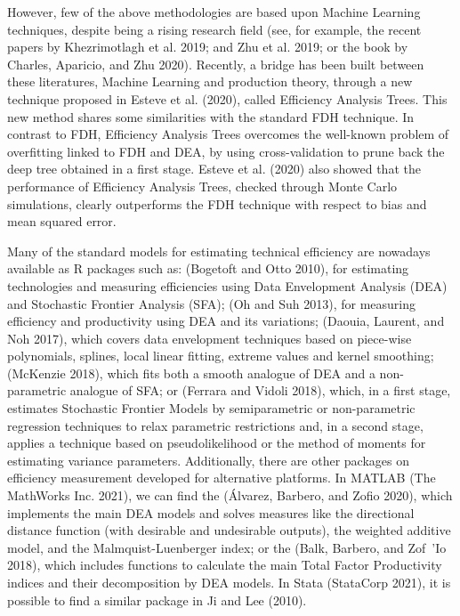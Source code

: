 However, few of the above methodologies are based upon Machine Learning techniques, despite being a rising research field (see, for example, the recent papers by Khezrimotlagh et al. 2019; and Zhu et al. 2019; or the book by Charles, Aparicio, and Zhu 2020). Recently, a bridge has been built between these literatures, Machine Learning and production theory, through a new technique proposed in Esteve et al. (2020), called Efficiency Analysis Trees. This new method shares some similarities with the standard FDH technique. In contrast to FDH, Efficiency Analysis Trees overcomes the well-known problem of overfitting linked to FDH and DEA, by using cross-validation to prune back the deep tree obtained in a first stage. Esteve et al. (2020) also showed that the performance of Efficiency Analysis Trees, checked through Monte Carlo simulations, clearly outperforms the FDH technique with respect to bias and mean squared error.

Many of the standard models for estimating technical efficiency are nowadays available as R packages such as:  (Bogetoft and Otto 2010), for estimating technologies and measuring efficiencies using Data Envelopment Analysis (DEA) and Stochastic Frontier Analysis (SFA);  (Oh and Suh 2013), for measuring efficiency and productivity using DEA and its variations;  (Daouia, Laurent, and Noh 2017), which covers data envelopment techniques based on piece-wise polynomials, splines, local linear fitting, extreme values and kernel smoothing;  (McKenzie 2018), which fits both a smooth analogue of DEA and a non-parametric analogue of SFA; or  (Ferrara and Vidoli 2018), which, in a first stage, estimates Stochastic Frontier Models by semiparametric or non-parametric regression techniques to relax parametric restrictions and, in a second stage, applies a technique based on pseudolikelihood or the method of moments for estimating variance parameters. Additionally, there are other packages on efficiency measurement developed for alternative platforms. In MATLAB (The MathWorks Inc. 2021), we can find the  (Álvarez, Barbero, and Zofio 2020), which implements the main DEA models and solves measures like the directional distance function (with desirable and undesirable outputs), the weighted additive model, and the Malmquist-Luenberger index; or the  (Balk, Barbero, and Zof~'Io 2018), which includes functions to calculate the main Total Factor Productivity indices and their decomposition by DEA models. In Stata (StataCorp 2021), it is possible to find a similar package in Ji and Lee (2010).

